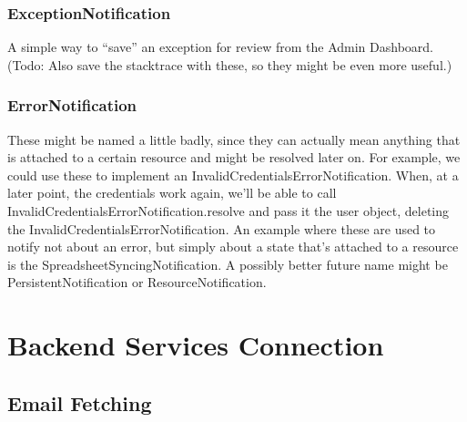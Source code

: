 \subsubsection{ExceptionNotification}

A simple way to “save” an exception for review from the Admin Dashboard. (Todo: Also save the stacktrace with these, so they might be even more useful.)

\subsubsection{ErrorNotification}

These might be named a little badly, since they can actually mean anything that is attached to a certain resource and might be resolved later on. For example, we could use these to implement an InvalidCredentialsErrorNotification. When, at a later point, the credentials work again, we’ll be able to call InvalidCredentialsErrorNotification.resolve and pass it the user object, deleting the InvalidCredentialsErrorNotification.
An example where these are used to notify not about an error, but simply about a state that’s attached to a resource is the SpreadsheetSyncingNotification.
A possibly better future name might be PersistentNotification or ResourceNotification.


\section{Backend Services Connection}



\subsection{Email Fetching}


